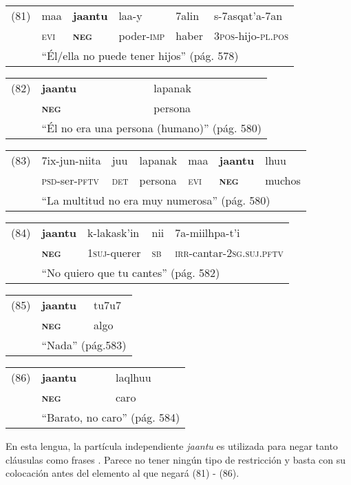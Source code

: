 {\setmainfont{Charis SIL} 

\begin{tabular}{llllll}
(81) & maa & \textbf{jaantu} & laa-y & 7alin & s-7asqat'a-7an \\
& \textsc{evi} & \textsc{\textbf{neg}} & poder-\textsc{imp} & haber & \textsc{3pos}-hijo-\textsc{pl.pos} \\
& \multicolumn{5}{l}{``Él/ella no puede tener hijos'' (pág. 578)}
\end{tabular} \vspace{0.5cm}

\begin{tabular}{lll}
(82) & \textbf{jaantu} & lapanak \\
& \textsc{\textbf{neg}} & persona \\
& \multicolumn{2}{l}{``Él no era una persona (humano)'' (pág. 580)}
\end{tabular} \vspace{0.5cm}

\begin{tabular}{lllllll}
(83) & 7ix-jun-niita & juu & lapanak & maa & \textbf{jaantu} & lhuu \\
& \textsc{psd}-ser-\textsc{pftv} & \textsc{det} & persona & \textsc{evi} & \textsc{\textbf{neg}} & muchos \\
& \multicolumn{6}{l}{``La multitud no era muy numerosa'' (pág. 580)}
\end{tabular} \vspace{0.5cm}

\begin{tabular}{lllll}
(84) & \textbf{jaantu} & k-lakask'in & nii & 7a-miilhpa-t'i \\
& \textsc{\textbf{neg}} & \textsc{1suj}-querer & \textsc{sb} & \textsc{irr}-cantar-\textsc{2sg.suj.pftv}\\
& \multicolumn{4}{l}{``No quiero que tu cantes'' (pág. 582)}
\end{tabular} \vspace{0.5cm}

\begin{tabular}{lll}
(85) & \textbf{jaantu} & tu7u7 \\
& \textsc{\textbf{neg}} & algo \\
& \multicolumn{2}{l}{``Nada'' (pág.583)}
\end{tabular} \vspace{0.5cm}

\begin{tabular}{lll}
(86) & \textbf{jaantu} & laqlhuu \\
& \textsc{\textbf{neg}} & caro \\
& \multicolumn{2}{l}{``Barato, no caro'' (pág. 584)}
\end{tabular} \vspace{0.5cm}

}

En esta lengua, la partícula independiente {\setmainfont{Charis SIL} \textit{jaantu}} es utilizada para negar tanto cláusulas como frases \textcolor{MidnightBlue}{\citep{Tepehua}}. Parece no tener ningún tipo de restricción y basta con su colocación antes del elemento al que negará (81) - (86).